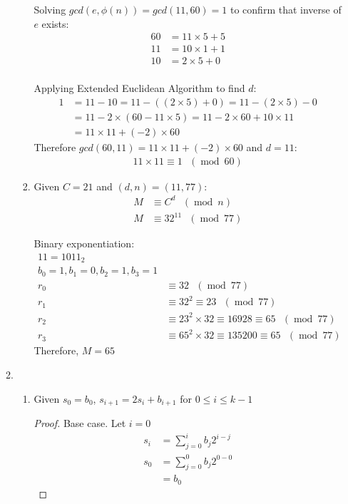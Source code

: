 \documentclass[11pt]{article}
\theoremstyle{definition}
\renewcommand{\pmod}[1]{\mbox{\ $(\ensuremath{\operatorname{mod}}\ {#1})$}}
\begin{document}
\begin{enumerate}
\begin{enumerate}
\begin{enumerate}
        Solving $gcd(e, \phi{(n)}) = gcd(11, 60) = 1$ to confirm that inverse of $e$ exists:
        \begin{align*}
          60 &= 11 \times 5 + 5 \\
          11 &= 10 \times 1 + 1 \\
          10 &= 2 \times 5 + 0 \\
        \end{align*}

        Applying Extended Euclidean Algorithm to find $d$:
        \begin{align*}
          1 &= 11 - 10 = 11 - ((2 \times 5) + 0) = 11 - (2 \times 5) - 0 \\
            &= 11 - 2 \times (60 - 11 \times 5) = 11 - 2 \times 60 + 10 \times 11 \\
            &= 11 \times 11 + (-2) \times 60
        \end{align*}
        Therefore $gcd(60, 11) = 11 \times 11 + (-2) \times 60$ and $d = 11$:
        \begin{align*}
          11 \times 11 \equiv 1 \pmod{60}
        \end{align*}
      \item
        Given $C = 21$ and $(d, n) = (11, 77)$:
        \begin{align*}
          M &\equiv C^d \pmod{n} \\
          M &\equiv 32^{11} \pmod{77}
        \end{align*}

        Binary exponentiation:
        \begin{align*}
          11 = 1011_{2} \\
          b_0 = 1, b_1 = 0, b_2 = 1, b_3 = 1 \\
          r_0 &\equiv 32 \pmod{77} \\
          r_1 &\equiv 32^2 \equiv 23 \pmod{77} \\
          r_2 &\equiv 23^2 \times 32 \equiv 16928 \equiv 65 \pmod{77} \\
          r_3 &\equiv 65^2 \times 32 \equiv 135200 \equiv 65 \pmod{77}
        \end{align*}
        Therefore, $M = 65$
    \end{enumerate}
  \newpage
  \item
    \begin{enumerate}
      \item
        Given $s_0 = b_0$, $s_{i + 1} = 2s_i + b_{i + 1}$ for $0 \leq i \leq k - 1$
        \begin{proof}
          Base case. Let $i = 0$
          \begin{align*}
            s_i &= \sum^{i}_{j = 0} b_j 2^{i - j} \\
            s_0 &= \sum^{0}_{j = 0} b_j2^{0 - 0} \\
                &= b_0
          \end{align*}


\end{proof}
\end{enumerate}
\end{enumerate}
\end{enumerate}
\end{document}
